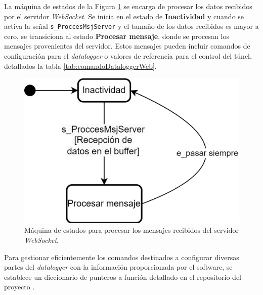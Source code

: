 

La máquina de estados de la Figura \ref{fig:sc_processComand} se encarga de procesar los datos recibidos por el servidor \textit{WebSocket}. Se inicia en el estado de \textbf{Inactividad} y cuando se activa la señal \texttt{s\_ProccesMsjServer} y el tamaño de los datos recibidos es mayor a cero, se transiciona al estado \textbf{Procesar mensaje}, donde se procesan los mensajes provenientes del servidor. Estos mensajes pueden incluir comandos de configuración para el \textit{datalogger} o valores de referencia para el control del túnel, detallados la tabla \ref{tab:comandoDataloggerWeb}.

\begin{figure}[H]
    \centering
    \includegraphics[width=0.45\linewidth]{Figuras/datalogger/Firmware/sc_processComand.png}
    \caption{Máquina de estados para procesar los mensajes recibidos del servidor \textit{WebSocket}.}
    \label{fig:sc_processComand}
\end{figure}

Para gestionar eficientemente los comandos destinados a configurar diversas partes del \textit{datalogger} con la información proporcionada por el software, se establece un diccionario de punteros a función detallado en el repositorio del proyecto \cite{FirmwareSCA2024}.


